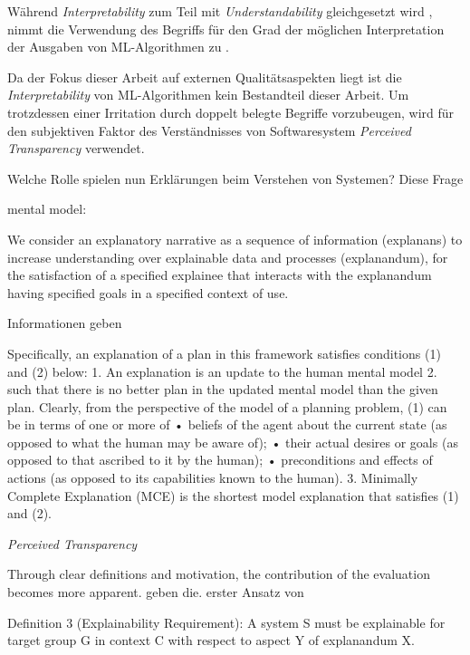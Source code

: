 Während \textit{Interpretability} zum Teil mit \textit{Understandability} gleichgesetzt wird \cite{chazette_end-users_nodate}, nimmt die Verwendung des Begriffs für den Grad der möglichen Interpretation der Ausgaben von ML-Algorithmen zu \cite{doshi2017towards}.

Da der Fokus dieser Arbeit auf externen Qualitätsaspekten liegt ist die \textit{Interpretability} von ML-Algorithmen kein Bestandteil dieser Arbeit. Um trotzdessen einer Irritation durch doppelt belegte Begriffe vorzubeugen, wird für den subjektiven Faktor des Verständnisses von Softwaresystem \textit{Perceived Transparency} verwendet.

\smallskip

Welche Rolle spielen nun Erklärungen beim Verstehen von Systemen? Diese Frage 

mental model: \cite{chi_three_nodate}

We consider an explanatory narrative as a sequence of information (explanans) to increase understanding over explainable data and processes (explanandum), for the satisfaction of a specified explainee that interacts with the explanandum having specified goals in a specified context of use. \cite{sovrano_modelling_2020}

Informationen geben \cite{wang_integration_2020}

Specifically, an explanation of a plan in this framework satisfies conditions (1) and (2) below: 1. An explanation is an update to the human mental model 2. such that there is no better plan in the updated mental model than the given plan. Clearly, from the perspective of the model of a planning problem, (1) can be in terms of one or more of • beliefs of the agent about the current state (as opposed to what the human may be aware of); • their actual desires or goals (as opposed to that ascribed to it by the human); • preconditions and effects of actions (as opposed to its capabilities known to the human). 3. Minimally Complete Explanation (MCE) is the shortest model explanation that satisfies (1) and (2). \cite{zahedi_towards_2019}

\textit{Perceived Transparency} \cite{wang_is_2018,balog_measuring_2020}

\glqq Through clear definitions and motivation, the contribution of the evaluation becomes more apparent. \grqq{} \cite{waa_evaluating_2021} \cite{chazette_knowledge_nodate} geben die. erster Ansatz von \cite{kohl_explainability_2019}

Definition 3 (Explainability Requirement): A system S must be explainable for target group G in context C with respect to aspect Y of explanandum X. \cite{kohl_explainability_2019}

